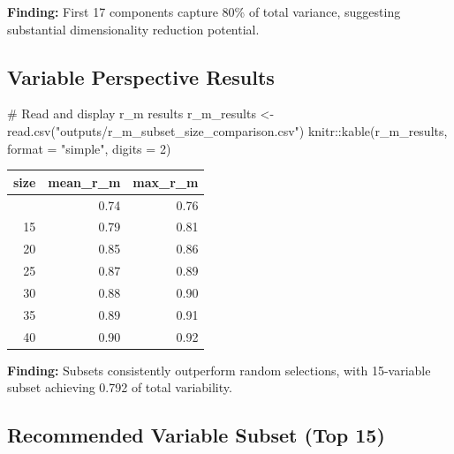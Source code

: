 \documentclass[
  letterpaper,
  DIV=11,
  numbers=noendperiod]{scrartcl}
\newenvironment{Shaded}{\begin{snugshade}}{\end{snugshade}}
\newcommand{\AttributeTok}[1]{\textcolor[rgb]{0.40,0.45,0.13}{#1}}
\newcommand{\CommentTok}[1]{\textcolor[rgb]{0.37,0.37,0.37}{#1}}
\newcommand{\DecValTok}[1]{\textcolor[rgb]{0.68,0.00,0.00}{#1}}
\newcommand{\FunctionTok}[1]{\textcolor[rgb]{0.28,0.35,0.67}{#1}}
\newcommand{\NormalTok}[1]{\textcolor[rgb]{0.00,0.23,0.31}{#1}}
\newcommand{\OtherTok}[1]{\textcolor[rgb]{0.00,0.23,0.31}{#1}}
\newcommand{\SpecialCharTok}[1]{\textcolor[rgb]{0.37,0.37,0.37}{#1}}
\newcommand{\StringTok}[1]{\textcolor[rgb]{0.13,0.47,0.30}{#1}}
\newcounter{none} %
\begin{document}
\textbf{Finding:} First 17 components capture 80\% of total variance,
suggesting substantial dimensionality reduction potential.

\subsection{Variable Perspective
Results}\label{variable-perspective-results}

\begin{Shaded}
\begin{Highlighting}[]
\CommentTok{\# Read and display r\_m results}
\NormalTok{r\_m\_results }\OtherTok{\textless{}{-}} \FunctionTok{read.csv}\NormalTok{(}\StringTok{"outputs/r\_m\_subset\_size\_comparison.csv"}\NormalTok{)}
\NormalTok{knitr}\SpecialCharTok{::}\FunctionTok{kable}\NormalTok{(r\_m\_results, }\AttributeTok{format =} \StringTok{"simple"}\NormalTok{, }\AttributeTok{digits =} \DecValTok{2}\NormalTok{)}
\end{Highlighting}
\end{Shaded}

{\def\LTcaptype{none} %
\begin{longtable}[]{@{}rrr@{}}
\toprule\noalign{}
size & mean\_r\_m & max\_r\_m \\
\midrule\noalign{}
\endhead
\bottomrule\noalign{}
\endlastfoot
10 & 0.74 & 0.76 \\
15 & 0.79 & 0.81 \\
20 & 0.85 & 0.86 \\
25 & 0.87 & 0.89 \\
30 & 0.88 & 0.90 \\
35 & 0.89 & 0.91 \\
40 & 0.90 & 0.92 \\
\end{longtable}
}

\textbf{Finding:} Subsets consistently outperform random selections,
with 15-variable subset achieving 0.792 of total variability.

\subsection{Recommended Variable Subset (Top
15)}\label{recommended-variable-subset-top-15}
\end{document}
